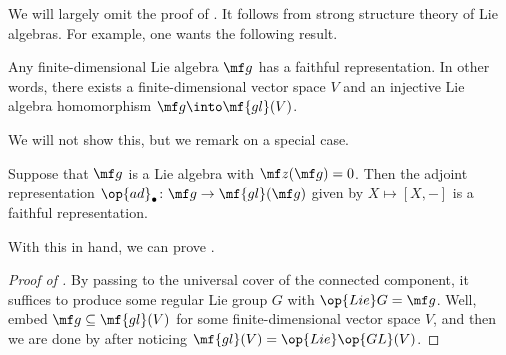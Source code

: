 \documentclass[../notes.tex]{subfiles}
\begin{document}
We will largely omit the proof of . It follows from strong structure theory of Lie algebras. For example, one wants the following result.
\begin{theorem}[Ado]
	Any finite-dimensional Lie algebra $\mf g$ has a faithful representation. In other words, there exists a finite-dimensional vector space $V$ and an injective Lie algebra homomorphism $\mf g\into\mf{gl}(V)$.
\end{theorem}
We will not show this, but we remark on a special case.
\begin{remark}
	Suppose that $\mf g$ is a Lie algebra with $\mf z(\mf g)=0$. Then the adjoint representation $\op{ad}_\bullet\colon\mf g\to\mf{gl}(\mf g)$ given by $X\mapsto[X,-]$ is a faithful representation.
\end{remark}
With this in hand, we can prove .
\begin{proof}[Proof of ]
	By passing to the universal cover of the connected component, it suffices to produce some regular Lie group $G$ with $\op{Lie}G=\mf g$. Well, embed $\mf g\subseteq\mf{gl}(V)$ for some finite-dimensional vector space $V$, and then we are done by  after noticing $\mf{gl}(V)=\op{Lie}\op{GL}(V)$.
\end{proof}
\end{document}
